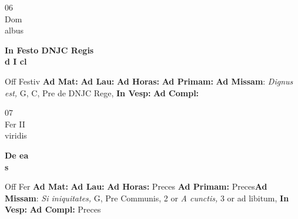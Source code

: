 \documentclass[10pt, openany]{book}
\begin{document}
        \begin{center}
            \begin{minipage}{3.5in}
                \vspace{2em}
                \begin{minipage}{0.5in}
                    {\Huge 06} \\
                    {\normalsize Dom} \\
                    {\normalsize albus}
                \end{minipage}
                \begin{minipage}{3.0in}
                    \textbf{ \large In Festo DNJC Regis \\
                    \textnormal{\normalsize d I cl}} \\ 
                \end{minipage}
                \begin{justify}Off Festiv
                    \textbf{Ad Mat: }
                    \textbf{Ad Lau: }
                    \textbf{Ad Horas: }
                    \textbf{Ad Primam: }\textbf{Ad Missam}: \textit{Dignus est,} G, C, Pre de DNJC Rege,  
                    \textbf{In Vesp: }
                    \textbf{Ad Compl: }
                \end{justify}
            \end{minipage}
        \end{center}
    
        \begin{center}
            \begin{minipage}{3.5in}
                \vspace{2em}
                \begin{minipage}{0.5in}
                    {\Huge 07} \\
                    {\normalsize Fer II} \\
                    {\normalsize viridis}
                \end{minipage}
                \begin{minipage}{3.0in}
                    \textbf{ \large De ea \\
                    \textnormal{\normalsize s}} \\ 
                \end{minipage}
                \begin{justify}Off Fer
                    \textbf{Ad Mat: }
                    \textbf{Ad Lau: }
                    \textbf{Ad Horas: }Preces
                    \textbf{Ad Primam: }Preces\textbf{Ad Missam}: \textit{Si iniquitates,} G, Pre Communis, 2 or \textit{A cunctis,} 3 or ad libitum,  
                    \textbf{In Vesp: }
                    \textbf{Ad Compl: }Preces
                \end{justify}
            \end{minipage}
        \end{center}
    
\end{document}
